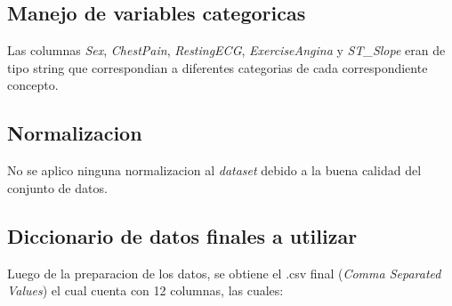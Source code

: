 \documentclass[12pt, letterpaper]{article}
\begin{document}
\subsection{Manejo de variables categoricas}
Las columnas \textit{Sex}, \textit{ChestPain}, \textit{RestingECG}, \textit{ExerciseAngina} y
\textit{ST\_Slope} eran de tipo string que correspondian a diferentes categorias de cada
correspondiente concepto. 

\subsection{Normalizacion}
No se aplico ninguna normalizacion al \textit{dataset} debido a la buena calidad del
conjunto de datos.

\subsection{Diccionario de datos finales a utilizar}
Luego de la preparacion de los datos, se obtiene el .csv final
(\textit{Comma Separated Values}) el cual cuenta con 12 columnas, las cuales:
\end{document}
